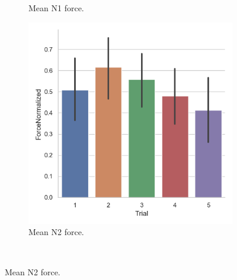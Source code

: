 \begin{figure}[H]
\begin{subfigure}[b]{0.3\textwidth}
         \caption{Mean N1 force.}
     \label{fig:forceN1Trial}
     \end{subfigure}
     \hspace{7mm}
      \begin{subfigure}[b]{0.3\textwidth}
         \centering
     \includegraphics[scale=0.4]{Files/Plots/forceNormalized_mean_by_trial.png}
         \caption{Mean N2 force.}
     \label{fig:forceN2Trial}
     \end{subfigure} \\
     

\end{figure}
